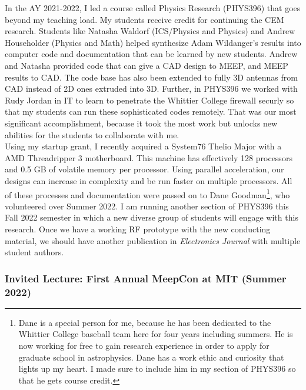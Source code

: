 \documentclass[../../../main.tex]{subfiles}
\begin{document}
In the AY 2021-2022, I led a course called Physics Research (PHYS396) that goes beyond my teaching load.  My students receive credit for continuing the CEM research.  Students like Natasha Waldorf (ICS/Physics and Physics) and Andrew Householder (Physics and Math) helped synthesize Adam Wildanger's results into computer code and documentation that can be learned by new students.  Andrew and Natasha provided code that can give a CAD design to MEEP, and MEEP results to CAD.  The code base has also been extended to fully 3D antennas from CAD instead of 2D ones extruded into 3D.  Further, in PHYS396 we worked with Rudy Jordan in IT to learn to penetrate the Whittier College firewall securly so that my students can run these sophisticated codes remotely.  That was our most significant accomplishment, because it took the most work but unlocks new abilities for the students to collaborate with me.
\\
\vspace{0.25cm}
Using my startup grant, I recently acquired a System76 Thelio Major with a AMD Threadripper 3 motherboard.  This machine has effectively 128 processors and 0.5 GB of volatile memory per processor.  Using parallel acceleration, our designs can increase in complexity and be run faster on multiple processors.  All of these processes and documentation were passed on to Dane Goodman\footnote{Dane is a special person for me, because he has been dedicated to the Whittier College baseball team here for four years including summers. He is now working for free to gain research experience in order to apply for graduate school in astrophysics.  Dane has a work ethic and curiosity that lights up my heart.  I made sure to include him in my section of PHYS396 so that he gets course credit.}, who volunteered over Summer 2022.  I am running another section of PHYS396 this Fall 2022 semester in which a new diverse group of students will engage with this research.  Once we have a working RF prototype with the new conducting material, we should have another publication in \textit{Electronics Journal} with multiple student authors.

\subsubsection{Invited Lecture: First Annual MeepCon at MIT (Summer 2022)}
\end{document}
